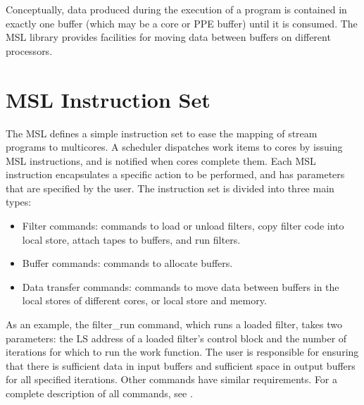 


Conceptually, data produced during the execution of a program is
contained in exactly one buffer (which may be a core or PPE buffer)
until it is consumed. The MSL library provides facilities for moving
data between buffers on different processors.
 
\section{MSL Instruction Set}

The MSL defines a simple instruction set to ease the mapping of stream
programs to multicores. A scheduler dispatches work items to cores by
issuing MSL instructions, and is notified when cores complete
them. Each MSL instruction encapsulates a specific action to be
performed, and has parameters that are specified by the user. The
instruction set is divided into three main types:
\begin{itemize}
\item Filter commands: commands to load or unload filters, copy filter code into local store, attach tapes to buffers, and run filters.
\item Buffer commands: commands to allocate buffers.
\item Data transfer commands: commands to move data between buffers in the local stores of different cores, or local store and memory.
\end{itemize}

As an example, the \textsf{filter\_run} command, which runs a loaded
filter, takes two parameters: the LS address of a loaded filter's
control block and the number of iterations for which to run the work function.
The user is responsible for ensuring that there is sufficient
data in input buffers and sufficient space in output buffers for all
specified iterations. Other commands have similar requirements. For a
complete description of all commands, see \cite{dxzhang-meng-07}.

